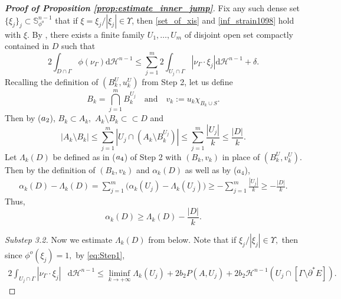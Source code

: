\documentclass[reqno]{amsart}
\numberwithin{equation}{section}
\theoremstyle{plain}
\theoremstyle{definition}
\renewcommand{\S}{\mathbb{S}}
\newcommand{\cH}{\mathcal{H}}
\newcommand{\p}{\partial}
\newcommand{\bound}{b}
\renewcommand{\d}{\mathrm{d}}
\newcommand{\strictlyincluded}{\subset\subset}
\begin{document}
\begin{proof}[\textbf{Proof of Proposition \ref{prop:estimate_inner_jump}}]
Fix any such dense set $\{\xi_j\}_j\subset \S_{\phi^o}^{n-1}$  that if $\xi=\xi_j/|\xi_j|\in\Upsilon$, then \eqref{set_of_xis} and \eqref{inf_strain1098} hold with $\xi.$ By \cite[Lemma 6]{DBD:1983}, there exists a finite family  $U_1,\ldots,U_m$ of disjoint open set compactly contained in $D$ such that
\begin{equation}\label{asdgar987}
2\int_{D\cap \Gamma} \phi(\nu_{\Gamma}) \d\cH^{n-1}  \le   \sum\limits_{j=1}^m  2\int_{U_j\cap \Gamma} |\nu_{\Gamma}\cdot \xi_j| \d\cH^{n-1} + \delta . 
\end{equation}
%
Recalling the definition of $(B_k^U,u_k^U)$ from Step 2, let us define 
$$
B_k=\bigcap\limits_{j=1}^m B_k^{U_j}\quad\text{and}\quad v_k:=u_k\chi_{B_k\cup S}.
$$
Then by ($\rm a_2$), $B_k\subset A_k,$ $A_k\setminus B_k\strictlyincluded D$ and
 $$
 |A_k\setminus B_k| \le \sum\limits_{j=1}^m |U_j\cap (A_k\setminus B_k^{U_j})| \le \sum\limits_{j=1}^m \frac{|U_j|}{k} \le \frac{|D|}{k}.
 $$ 
Let $\Lambda_k(D)$ be defined as in ($\rm a_4$) of Step 2 with $(B_k,v_k)$ in place of  $(B_k^U,v_k^U)$.  Then by the definition of $(B_k,v_k)$  and $\alpha_k(D)$ as well as by ($a_4$),
\begin{align*}
\alpha_k(D) - \Lambda_k(D) = \sum\limits_{j=1}^m\big( \alpha_k(U_j) - \Lambda_k(U_j) \big) \ge  -\sum\limits_{j=1}^m \frac{|U_j|}{k} \ge- \frac{|D|}{k}. 
\end{align*}
Thus, 
\begin{equation}\label{lower_estimate_for_alpha}
\alpha_k(D) \ge \Lambda_k(D) - \frac{|D|}{k}. 
\end{equation}

{\it Substep 3.2.} Now we estimate $\Lambda_k(D)$ from below.
 Note that if $\xi_j/|\xi_j| \in \Upsilon,$ then since $\phi^o(\xi_j)=1,$ by \eqref{eq:Step1},
\begin{align}\label{is0r98}
2 \int_{U_j\cap \Gamma}|\nu_\Gamma\cdot\xi_j| &\d\cH^{n-1} \le   \liminf\limits_{k\to+\infty} \Lambda_k(U_j) 
+
2\bound_2P(A,U_j)+2\bound_2\cH^{n-1}(U_j \cap [\Gamma\setminus \p^*E]).
\end{align}


\end{proof}
\end{document}
